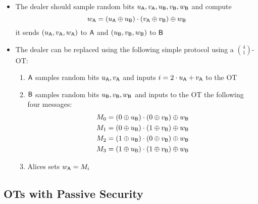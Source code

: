 \begin{itemize}
\begin{itemize}
        \item The dealer should sample random bits $u_{\mathsf{A}}, v_{\mathsf{A}}, u_{\mathsf{B}}, v_{\mathsf{B}}, w_{\mathsf{B}}$ and compute
        \begin{equation*}
            w_{\mathsf{A}} = (u_{\mathsf{A}} \oplus u_{\mathsf{B}}) \cdot (v_{\mathsf{A}} \oplus v_{\mathsf{B}}) \oplus w_{\mathsf{B}}
        \end{equation*}
        it sends $(u_{\mathsf{A}}, v_{\mathsf{A}}, w_{\mathsf{A}})$ to $\mathsf{A}$ and $(u_{\mathsf{B}}, v_{\mathsf{B}}, w_{\mathsf{B}})$ to $\mathsf{B}$
        \item The dealer can be replaced using the following simple protocol using a $4 \choose 1$-OT:
        \begin{enumerate}
            \item $\mathsf{A}$ samples random bits $u_{\mathsf{A}}, v_{\mathsf{A}}$ and inputs $i = 2 \cdot u_{\mathsf{A}} + v_{\mathsf{A}}$ to the OT
            \item $\mathsf{B}$ samples random bits $u_{\mathsf{B}}, v_{\mathsf{B}}, w_{\mathsf{B}}$ and inputs to the OT the following four messages:
            \begin{align*}
                M_0 &= (0 \oplus u_{\mathsf{B}}) \cdot (0 \oplus v_{\mathsf{B}}) \oplus w_{\mathsf{B}} \\
                M_1 &= (0 \oplus u_{\mathsf{B}}) \cdot (1 \oplus v_{\mathsf{B}}) \oplus w_{\mathsf{B}} \\
                M_2 &= (1 \oplus u_{\mathsf{B}}) \cdot (0 \oplus v_{\mathsf{B}}) \oplus w_{\mathsf{B}} \\
                M_3 &= (1 \oplus u_{\mathsf{B}}) \cdot (1 \oplus v_{\mathsf{B}}) \oplus w_{\mathsf{B}} \\
            \end{align*}
            \item Alices sets $w_{\mathsf{A}} = M_i$
        \end{enumerate}
    \end{itemize}
\end{itemize}

\subsection{OTs with Passive Security}
